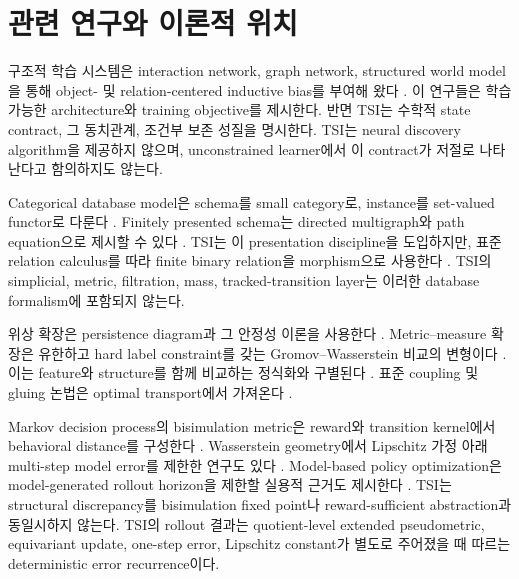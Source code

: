 \section{관련 연구와 이론적 위치}

구조적 학습 시스템은 interaction network, graph network, structured world
model을 통해 object- 및 relation-centered inductive bias를 부여해 왔다
\cite{battaglia2016interaction,battaglia2018relational,
kipf2020contrastive}. 이 연구들은 학습 가능한 architecture와 training
objective를 제시한다. 반면 TSI는 수학적 state contract, 그 동치관계, 조건부
보존 성질을 명시한다. TSI는 neural discovery algorithm을 제공하지 않으며,
unconstrained learner에서 이 contract가 저절로 나타난다고 함의하지도 않는다.

Categorical database model은 schema를 small category로, instance를
set-valued functor로 다룬다 \cite{maclane1998categories,spivak2012functorial}.
Finitely presented
schema는 directed multigraph와 path equation으로 제시할 수 있다
\cite{spivakwisnesky2015relational}. TSI는 이 presentation discipline을
도입하지만, 표준 relation calculus를 따라 finite binary relation을 morphism으로
사용한다 \cite{freydscedrov1990categories}. TSI의 simplicial, metric,
filtration, mass, tracked-transition layer는 이러한 database formalism에
포함되지 않는다.

위상 확장은 persistence diagram과 그 안정성 이론을 사용한다
\cite{edelsbrunner2002topological,zomorodian2005computing,
cohensteiner2007stability,chazal2009proximity,bauerlesnick2015induced,
crawleyboevey2015decomposition}. Metric--measure 확장은 유한하고
hard label constraint를 갖는 Gromov--Wasserstein 비교의 변형이다
\cite{memoli2011gromov}. 이는 feature와 structure를 함께 비교하는 정식화와
구별된다 \cite{vayer2020fused}. 표준 coupling 및 gluing 논법은 optimal
transport에서 가져온다 \cite{villani2009optimal,peyre2019computational}.

Markov decision process의 bisimulation metric은 reward와 transition kernel에서
behavioral distance를 구성한다 \cite{ferns2004metrics}. Wasserstein geometry에서
Lipschitz 가정 아래 multi-step model error를 제한한 연구도 있다
\cite{asadi2018lipschitz}. Model-based policy optimization은 model-generated
rollout horizon을 제한할 실용적 근거도 제시한다 \cite{janner2019trust}. TSI는
structural discrepancy를 bisimulation fixed
point나 reward-sufficient abstraction과 동일시하지 않는다. TSI의 rollout 결과는
quotient-level extended pseudometric, equivariant update, one-step error,
Lipschitz constant가 별도로 주어졌을 때 따르는 deterministic error recurrence이다.
